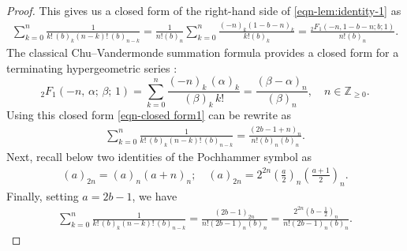 \documentclass[a4paper,11pt,reqno]{amsart}
\begin{document}
\begin{proof}
This gives us a closed form of the right-hand side of \eqref{eqn-lem:identity-1} as
    \begin{align}\label{eqn-closed form1}
       \sum_{k=0}^{n} \frac{1}{k!\,(b)_k (n-k)!\,(b)_{n-k}}= \frac{1}{n! (b)_n} \sum_{k=0}^{n} \frac{ (-n)_k (1-b-n)_k}{k! (b)_k }=\frac{{}_2F_{1}(-n, 1-b-n; b; 1)}{n! (b)_n}. 
    \end{align}
The classical Chu--Vandermonde summation formula provides a closed form for a terminating hypergeometric series \cite{Slater1966}:
\[
{}_2F_{1}\!\left(-n,\,\alpha;\,\beta;\,1\right)
=\sum_{k=0}^{n}\frac{(-n)_k\,(\alpha)_k}{(\beta)_k\,k!}
=\frac{(\beta-\alpha)_n}{(\beta)_n}, \quad n \in \mathbb{Z}_{\ge 0}.
\]
Using this closed form \eqref{eqn-closed form1} can be rewrite as 
 \begin{align}\label{eqn-closed form2}
       \sum_{k=0}^{n} \frac{1}{k!\,(b)_k (n-k)!\,(b)_{n-k}}=\frac{(2b-1+n)_n}{n! (b)_n (b)_n}. 
    \end{align}
Next, recall below two identities of the Pochhammer symbol as
\begin{align}\label{eqn-closed form3}
      (a)_{2n}=(a)_n (a+n)_n ; \quad   (a)_{2n}=2^{2n} \left(\frac{a}{2}\right)_n\left(\frac{a+1}{2}\right)_n. 
    \end{align}
Finally, setting $a=2b-1$, we have 
 \begin{align}\label{eqn-closed form2}
       \sum_{k=0}^{n} \frac{1}{k!\,(b)_k (n-k)!\,(b)_{n-k}}=\frac{(2b-1)_{2n} }{n! (2b-1)_{n} (b)_n }=\frac{2^{2n} \left(b-\frac{1}{2}\right)_n}{n! (2b-1)_{n} (b)_n}.
    \end{align}
\end{proof}
\end{document}
